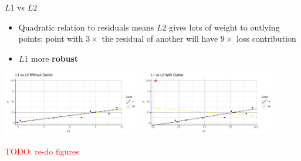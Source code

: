 \documentclass[11pt,compress,t,notes=noshow, xcolor=table]{beamer}
\begin{document}
\begin{vbframe}{$L1$ vs $L2$}

\begin{itemize}
    \item Quadratic relation to residuals means $L2$ gives lots of weight to
    outlying points: point with $3 \times$ the residual of another will have
    $9 \times$ loss contribution
    \item $L1$ more \textbf{robust}
\end{itemize}

\vfill
\includegraphics[width=0.45\textwidth]{figure_man/l2-vs-l1-1.pdf}
\includegraphics[width=0.45\textwidth]{figure_man/l2-vs-l1-2.pdf}

\textcolor{red}{TODO: re-do figures}

\end{vbframe}
\end{document}
